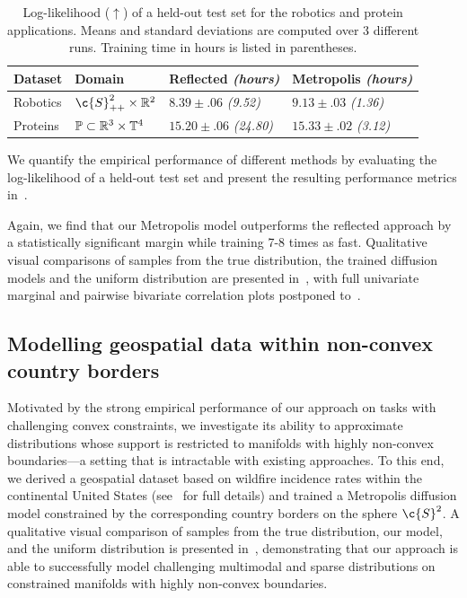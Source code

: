 \begin{table}[H]
	\caption{
		Log-likelihood ($\uparrow$) of a held-out test set for the robotics and protein applications.
		Means and standard deviations are computed over 3 different runs.
		Training time in hours is listed in parentheses.
	}
	\label{tab:real_world_data}
	\centering

	\vspace{1em}
	\begin{tabular}{llll}
		\toprule
		Dataset  & Domain                                      & {Reflected \emph{(hours)}}     & {Metropolis \emph{(hours)}}             \\
		\midrule
		Robotics & \(\c{S}_{++}^2\times\R^2\)                  & $8.39 \pm{.06}$ \emph{(9.52)}  & $\mathbf{9.13 \pm{.03}}$ \emph{(1.36)}  \\
		Proteins & \(\mathbb{P}\subset\mathbb{R}^3\times\mathbb{T}^4\) & $15.20\pm{.06}$ \emph{(24.80)} & $\mathbf{15.33 \pm{.02}}$ \emph{(3.12)} \\
		\bottomrule
	\end{tabular}
\end{table}

We quantify the empirical performance of different methods by evaluating the log-likelihood of a held-out test set and present the resulting performance metrics in~.

Again, we find that our Metropolis model outperforms the reflected approach by a statistically significant margin while training 7-8 times as fast.
Qualitative visual comparisons of samples from the true distribution, the trained diffusion models and the uniform distribution are presented in~, with full univariate marginal and pairwise bivariate correlation plots postponed to~.

\subsection{Modelling geospatial data within non-convex country borders}
\label{sec:exp_wildfires}

Motivated by the strong empirical performance of our approach on tasks with challenging convex constraints, we investigate its ability to approximate distributions whose support is restricted to manifolds with highly non-convex boundaries---a setting that is intractable with existing approaches.
To this end, we derived a geospatial dataset based on wildfire incidence rates within the continental United States (see~ for full details) and trained a Metropolis diffusion model constrained by the corresponding country borders on the sphere $\c{S}^2$.
A qualitative visual comparison of samples from the true distribution, our model, and the uniform distribution is presented in~, demonstrating that our approach is able to successfully model challenging multimodal and sparse distributions on constrained manifolds with highly non-convex boundaries.


